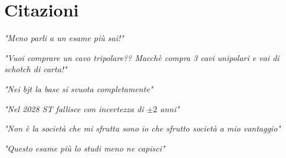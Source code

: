 \chapter{Citazioni}

\raggedright
{\itshape "Meno parli a un esame più sai!"}
\raggedleft

\vspace{5mm}

\raggedleft
{\itshape "Vuoi comprare un cavo tripolare?? Macchè compra 3 cavi unipolari e vai di schotch di carta!"}
\raggedright

\vspace{5mm}

\raggedright
{\itshape "Nei bjt la base si svuota completamente"}
\raggedleft

\vspace{5mm}

\raggedleft
{\itshape "Nel 2028 ST fallisce con incertezza di $\pm 2$ anni"}
\raggedright

\vspace{5mm}

\raggedright
{\itshape "Non è la società che mi sfrutta sono io che sfrutto società a mio vantaggio"}
\raggedleft

\vspace{5mm}

\raggedleft
{\itshape "Questo esame più lo studi meno ne capisci"}
\raggedright
